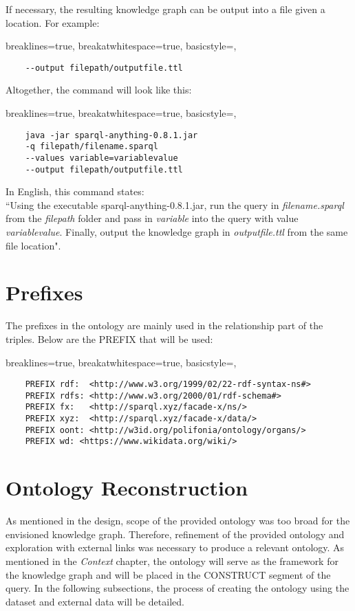\noindent If necessary, the resulting knowledge graph can be output into a file given a location. For example:

\lstset
{
    breaklines=true,
    breakatwhitespace=true,
    basicstyle=\ttfamily,
}
\begin{lstlisting}
    --output filepath/outputfile.ttl
\end{lstlisting}

\noindent Altogether, the command will look like this:

\lstset
{
    breaklines=true,
    breakatwhitespace=true,
    basicstyle=\ttfamily,
}
\begin{lstlisting}
    java -jar sparql-anything-0.8.1.jar
    -q filepath/filename.sparql 
    --values variable=variablevalue 
    --output filepath/outputfile.ttl
\end{lstlisting}

\noindent In English, this command states: \\
\hspace*{0.5cm} ``Using the executable sparql-anything-0.8.1.jar, run the query in \textit{filename.sparql} from the \textit{filepath} folder and pass in \textit{variable} into the query with value \textit{variablevalue}. Finally, output the knowledge graph in \textit{outputfile.ttl} from the same file location". 

\section{Prefixes}
\hspace*{0.5cm} The prefixes in the ontology are mainly used in the relationship part of the triples. Below are the PREFIX that will be used:

\lstset
{
    breaklines=true,
    breakatwhitespace=true,
    basicstyle=\ttfamily,
}
\begin{lstlisting}
    PREFIX rdf:  <http://www.w3.org/1999/02/22-rdf-syntax-ns#>
    PREFIX rdfs: <http://www.w3.org/2000/01/rdf-schema#>
    PREFIX fx:   <http://sparql.xyz/facade-x/ns/>
    PREFIX xyz:  <http://sparql.xyz/facade-x/data/>
    PREFIX oont: <http://w3id.org/polifonia/ontology/organs/>
    PREFIX wd: <https://www.wikidata.org/wiki/> 
\end{lstlisting}

\section{Ontology Reconstruction}
\hspace*{0.5cm} As mentioned in the design, scope of the provided ontology was too broad for the envisioned knowledge graph. Therefore, refinement of the provided ontology and exploration with external links was necessary to produce a relevant ontology. As mentioned in the \textit{Context} chapter, the ontology will serve as the framework for the knowledge graph and will be placed in the CONSTRUCT segment of the query. In the following subsections, the process of creating the ontology using the dataset and external data will be detailed.

